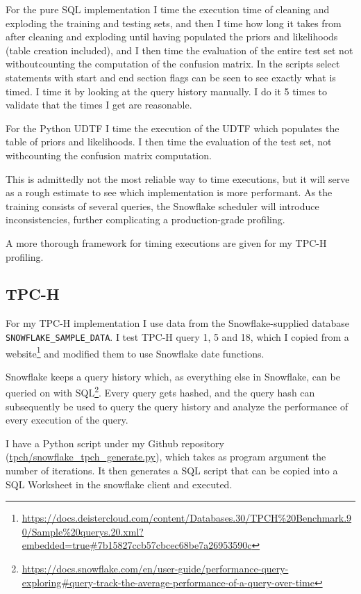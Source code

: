 \documentclass{article}
\begin{document}
\medskip \noindent For the pure SQL implementation I time the execution time of cleaning and exploding the training and testing sets, and then I time how long it takes from after cleaning and exploding until having populated the priors and likelihoods (table creation included), and I then time the evaluation of the entire test set not withoutcounting the computation of the confusion matrix. In the scripts select statements with start and end section flags can be seen to see exactly what is timed. I time it by looking at the query history manually. I do it 5 times to validate that the times I get are reasonable. 

\medskip \noindent For the Python UDTF I time the execution of the UDTF which populates the table of priors and likelihoods. I then time the evaluation of the test set, not withcounting the confusion matrix computation.

\medskip \noindent This is admittedly not the most reliable way to time executions, but it will serve as a rough estimate to see which implementation is more performant. As the training consists of several queries, the Snowflake scheduler will introduce inconsistencies, further complicating a production-grade profiling. 

\medskip \noindent A more thorough framework for timing executions are given for my TPC-H profiling. 


\subsection{TPC-H}
For my TPC-H implementation I use data from the Snowflake-supplied database \texttt{SNOWFLAKE\_SAMPLE\_DATA}. I test TPC-H query 1, 5 and 18, which I copied from a website\footnote{\url{https://docs.deistercloud.com/content/Databases.30/TPCH\%20Benchmark.90/Sample\%20querys.20.xml?embedded=true\#7b15827ccb57cbcec68be7a26953590c}} and modified them to use Snowflake date functions. 

\medskip \noindent Snowflake keeps a query history which, as everything else in Snowflake, can be queried on with SQL\footnote{\url{https://docs.snowflake.com/en/user-guide/performance-query-exploring#query-track-the-average-performance-of-a-query-over-time}}. Every query gets hashed, and the query hash can subsequently be used to query the query history and analyze the performance of every execution of the query.

\medskip \noindent I have a Python script under my Github repository (\url{tpch/snowflake_tpch_generate.py}), which takes as program argument the number of iterations. It then generates a SQL script that can be copied into a SQL Worksheet in the snowflake client and executed. 
\end{document}
